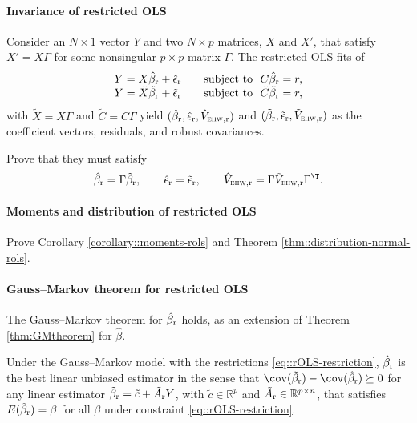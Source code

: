 \paragraph{Invariance of restricted OLS}\label{para::invariance-rls}

Consider an $N \times 1$ vector $ Y$  and two $N\times p$ matrices, $X$ and $X'$, that satisfy $X' = X\Gamma$ for some nonsingular $p\times p$ matrix $\Gamma$. 
The restricted OLS fits of 
$$
\begin{array}{ll}
Y =  X\hat{\beta}_\textup{r} + \hat{\epsilon}_\textup{r}  &\quad\text{subject to} \ \ C \hat{\beta}_\textup{r}  = r, 
 \\
Y =  \tilde X \tilde{\beta}_\textup{r}  +\tilde{\epsilon}_\textup{r}  &\quad \text{subject to} \ \ \tilde C  \tilde{\beta}_\textup{r}    = r ,
\end{array}
$$
with $\tilde X = X\Gamma$ and $\tilde C = C\Gamma$
yield $(\hat{\beta}_\textup{r} ,  \hat{\epsilon}_\textup{r},  \hat{V}_{\textsc{ehw}, \textup{r}})$ and $(\tilde{\beta}_\textup{r}  ,  \tilde{\epsilon}_\textup{r}  ,  \tilde{V}_{\textsc{ehw}, \textup{r}}  )$ as the coefficient vectors, residuals, and robust covariances. 


Prove that they must satisfy 
$$
\hat{\beta}_\textup{r} = \Gamma \tilde{\beta}_\textup{r} ,\qquad
\hat{\epsilon}_\textup{r} = \tilde{\epsilon}_\textup{r}  ,\qquad
\hat{V}_{\textsc{ehw}, \textup{r}}= \Gamma \tilde{V}_{\textsc{ehw}, \textup{r}}   \Gamma^{\T}.
$$ 


\paragraph{Moments and distribution of restricted OLS}
\label{para::moments-distribution-rols}

Prove Corollary \ref{corollary::moments-rols} and Theorem \ref{thm::distribution-normal-rols}. 


\paragraph{Gauss--Markov theorem for restricted OLS}
\label{para::gauss-markov-rols}

The Gauss--Markov theorem for $\hat{\beta}_\textup{r} $ holds, as an extension of Theorem \ref{thm:GMtheorem} for  $\hat{\beta} $. 

\begin{theorem}
\label{thm::gauss-markov-rols}
Under the  Gauss--Markov model with the restrictions \eqref{eq::rOLS-restriction}, $\hat{\beta}_\textup{r} $ is the best linear unbiased estimator in the sense that $ \cov(\tilde{\beta}_\textup{r}) -  \cov( \hat{\beta}_\textup{r}  ) \succeq 0$ for any linear estimator $\tilde{\beta}_\textup{r} = \tilde{c} + \tilde{A}_\textup{r} Y$, with $\tilde{c} \in \mathbb{R}^p$ and $\tilde{A}_\textup{r} \in \mathbb{R}^{p\times n}$, that satisfies $E(\tilde{\beta}_\textup{r}) = \beta$ for all $\beta$ under constraint \eqref{eq::rOLS-restriction}. 
\end{theorem}

